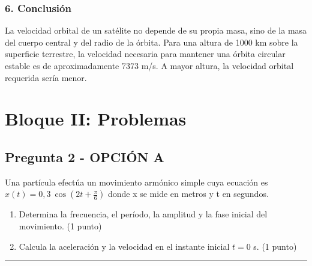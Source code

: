 \subsubsection*{6. Conclusión}
\begin{cajaconclusion}
La velocidad orbital de un satélite no depende de su propia masa, sino de la masa del cuerpo central y del radio de la órbita. Para una altura de 1000 km sobre la superficie terrestre, la velocidad necesaria para mantener una órbita circular estable es de aproximadamente 7373 m/s. A mayor altura, la velocidad orbital requerida sería menor.
\end{cajaconclusion}

\newpage

\section{Bloque II: Problemas}
\label{sec:ondas_2006_sep}

\subsection{Pregunta 2 - OPCIÓN A}
\label{subsec:2A_2006_sep}

\begin{cajaenunciado}
Una partícula efectúa un movimiento armónico simple cuya ecuación es $x(t)=0,3~\cos(2t+\frac{\pi}{6})$ donde x se mide en metros y t en segundos. 
\begin{enumerate}
    \item Determina la frecuencia, el período, la amplitud y la fase inicial del movimiento. (1 punto) 
    \item Calcula la aceleración y la velocidad en el instante inicial $t=0$ s. (1 punto) 
\end{enumerate}
\end{cajaenunciado}
\hrule

